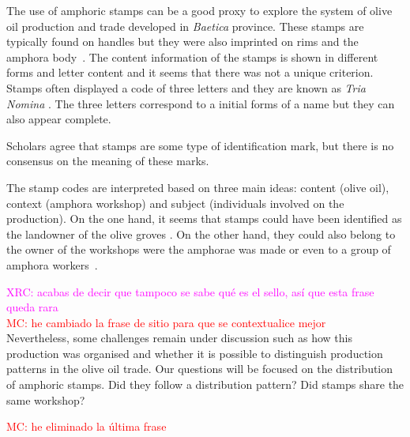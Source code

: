 \documentclass[review]{elsarticle}
\newcommand{\memo}[2]{\textcolor{#1}{#2}}
\newcommand{\maria}[1]{\memo{red}{MC: #1\\}}
\newcommand{\xavi}[1]{\memo{magenta}{XRC: #1\\}}
\begin{document}
The use of amphoric stamps can be a good proxy to explore the system of olive oil production and trade developed in \textit{Baetica} province. These stamps are typically found on handles but they were also imprinted on rims and the amphora body~\citep{millet_anforas_1998}. The content information of the stamps is shown in different forms and letter content and it seems that there was not a unique criterion.
Stamps often displayed a code of three letters and they are known as \textit{Tria Nomina} \citep{berni_millet_amphora_1996}. The three letters correspond to a initial forms of a name but they can also appear complete. 

Scholars agree that stamps are some type of identification mark, but there is no consensus on the meaning of these marks\citep{rodriguez_baetican_1998}. 


The stamp codes are interpreted based on three main ideas: content (olive oil), context (amphora workshop) and subject (individuals involved on the production). On the one hand, it seems that stamps could have been identified as the landowner of the olive groves \citep{rodriguez_economioleicola_1977}. On the other hand, they could also belong to the owner of the workshops were the amphorae was made or even to a group of amphora workers~\citep{berni_millet_epigrafianforica_2008}. 

\xavi{acabas de decir que tampoco se sabe qué es el sello, así que esta frase queda rara} 
\maria{he cambiado la frase de sitio para que se contextualice mejor}
Nevertheless, some challenges remain under discussion such as how this production was organised and whether it is possible to distinguish production patterns in the olive oil trade. Our questions will be focused on the distribution of amphoric stamps. Did they follow a distribution pattern? Did stamps share the same workshop? 

\maria{he eliminado la última frase}
  
\end{document}
